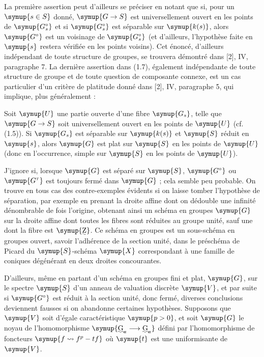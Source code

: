 La première assertion peut d'ailleurs se préciser en notant que si, pour un
$\symup{s\in S}$ donné, $\symup{G\to S}$ est universellement ouvert en les points
de $\symup{G_s^\circ}$ et si $\symup{G_s^\circ}$ est séparable sur $\symup{k(s)}$, alors $\symup{G^\circ}$ est
un voisinage de $\symup{G_s^\circ}$ (et d'ailleurs, l'hypothèse faite en $\symup{s}$ restera
vérifiée en les points voisins). Cet énoncé, d'ailleurs indépendant de toute
structure de groupes, se trouvera démontré dans [2], IV, paragraphe 7. La
dernière assertion dans (1.7), également indépendante de toute structure de
groupe et de toute question de composante {connexe}, est un cas particulier d'un
critère de platitude donné dans [2], IV, paragraphe 5, qui implique, plus
généralement :

 Soit $\symup{U}$ une partie ouverte d'une fibre $\symup{G_s}$, telle
que $\symup{G\to S}$ soit universellement ouvert en les points de $\symup{U}$ (cf.
(1.5)). Si $\symup{G_s}$ est séparable sur $\symup{k(s)}$ et $\symup{S}$ réduit en $\symup{s}$, alors $\symup{G}$ est
plat sur $\symup{S}$ en les points de $\symup{U}$ (donc en l'occurrence, simple sur $\symup{S}$ en les
points de $\symup{U}$).

 J'ignore si, lorsque $\symup{G}$ est séparé sur $\symup{S}$, $\symup{G^\circ}$
ou $\symup{G^\tau}$ est toujours fermé dans $\symup{G}$ ; cela semble peu probable. On trouve
en tous cas des contre-exemples évidents si on laisse tomber l'hypothèse de
séparation, par exemple en prenant la droite affine dont on dédouble une
infinité dénombrable de fois l'origine, obtenant ainsi un schéma en groupes $\symup{G}$
sur la droite affine dont toutes les fibres sont réduites au groupe unité, sauf
une dont la fibre est $\symup{\text{\uwave{Z}}}$. Ce schéma en groupes est un sous-schéma en
groupes ouvert, savoir l'adhérence de la section unité, dans le préschéma de
Picard du $\symup{S}$-schéma $\symup{X}$ correspondant à une famille de coniques dégénérant en
deux droites concourantes.

D'ailleurs, même en partant d'un schéma en groupes fini et plat, $\symup{G}$, sur le
spectre $\symup{S}$ d'un anneau de valuation discrète $\symup{V}$, et par suite si $\symup{G^\circ}$
est réduit à la section unité, donc fermé, diverses conclusions deviennent
fausses si on abandonne certaines hypothèses. Supposons que $\symup{V}$ soit d'égale
caractéristique $\symup{p>0}$, et soit $\symup{G}$ le noyau de l'homomorphisme
$\symup{\text{\uwave{G}}_a\longrightarrow\text{\uwave{G}}_a}$ défini par l'homomorphisme de
foncteurs $\symup{f\rightsquigarrow f^p-tf}$ où $\symup{t}$ est une uniformisante de $\symup{V}$.

